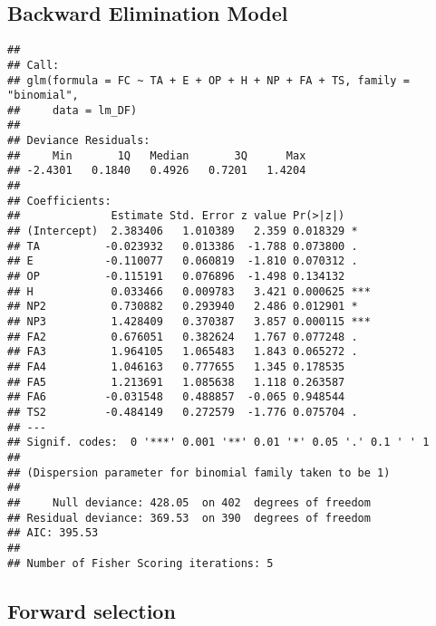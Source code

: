 \documentclass[]{article}
\begin{document}
\hypertarget{backward-elimination-model-1}{%
\subsection{Backward Elimination
Model}\label{backward-elimination-model-1}}

\begin{verbatim}
## 
## Call:
## glm(formula = FC ~ TA + E + OP + H + NP + FA + TS, family = "binomial", 
##     data = lm_DF)
## 
## Deviance Residuals: 
##     Min       1Q   Median       3Q      Max  
## -2.4301   0.1840   0.4926   0.7201   1.4204  
## 
## Coefficients:
##              Estimate Std. Error z value Pr(>|z|)    
## (Intercept)  2.383406   1.010389   2.359 0.018329 *  
## TA          -0.023932   0.013386  -1.788 0.073800 .  
## E           -0.110077   0.060819  -1.810 0.070312 .  
## OP          -0.115191   0.076896  -1.498 0.134132    
## H            0.033466   0.009783   3.421 0.000625 ***
## NP2          0.730882   0.293940   2.486 0.012901 *  
## NP3          1.428409   0.370387   3.857 0.000115 ***
## FA2          0.676051   0.382624   1.767 0.077248 .  
## FA3          1.964105   1.065483   1.843 0.065272 .  
## FA4          1.046163   0.777655   1.345 0.178535    
## FA5          1.213691   1.085638   1.118 0.263587    
## FA6         -0.031548   0.488857  -0.065 0.948544    
## TS2         -0.484149   0.272579  -1.776 0.075704 .  
## ---
## Signif. codes:  0 '***' 0.001 '**' 0.01 '*' 0.05 '.' 0.1 ' ' 1
## 
## (Dispersion parameter for binomial family taken to be 1)
## 
##     Null deviance: 428.05  on 402  degrees of freedom
## Residual deviance: 369.53  on 390  degrees of freedom
## AIC: 395.53
## 
## Number of Fisher Scoring iterations: 5
\end{verbatim}

\hypertarget{forward-selection}{%
\subsection{Forward selection}\label{forward-selection}}
\end{document}
